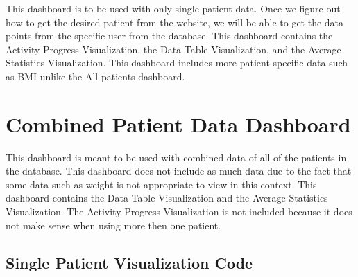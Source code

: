 \documentclass[]{book}
\begin{document}
This dashboard is to be used with only single patient data. Once we
figure out how to get the desired patient from the website, we will be
able to get the data points from the specific user from the database.
This dashboard contains the Activity Progress Visualization, the Data
Table Visualization, and the Average Statistics Visualization. This
dashboard includes more patient specific data such as BMI unlike the All
patients dashboard.

\section{Combined Patient Data
Dashboard}\label{combined-patient-data-dashboard}

This dashboard is meant to be used with combined data of all of the
patients in the database. This dashboard does not include as much data
due to the fact that some data such as weight is not appropriate to view
in this context. This dashboard contains the Data Table Visualization
and the Average Statistics Visualization. The Activity Progress
Visualization is not included because it does not make sense when using
more then one patient.

\subsection{Single Patient Visualization
Code}\label{single-patient-visualization-code}
\end{document}
